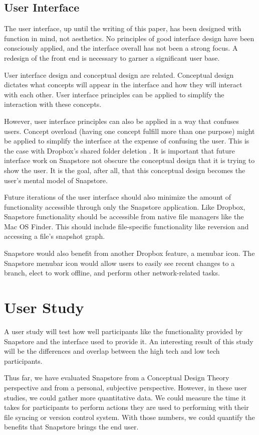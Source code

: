 \subsection{User Interface}

The user interface, up until the writing of this paper, has been designed with function in mind, not aesthetics. No principles of good interface design have been consciously applied, and the interface overall has not been a strong focus. A redesign of the front end is necessary to garner a significant user base.

User interface design and conceptual design are related. Conceptual design dictates what concepts will appear in the interface and how they will interact with each other. User interface principles can be applied to simplify the interaction with these concepts. 

However, user interface principles can also be applied in a way that confuses users. Concept overload (having one concept fulfill more than one purpose) might be applied to simplify the interface at the expense of confusing the user. This is the case with Dropbox's shared folder deletion \cite{Zhang}. It is important that future interface work on Snapstore not obscure the conceptual design that it is trying to show the user. It is the goal, after all, that this conceptual design becomes the user's mental model of Snapstore.

Future iterations of the user interface should also minimize the amount of functionality accessible through only the Snapstore application. Like Dropbox, Snapstore functionality should be accessible from native file managers like the Mac OS Finder. This should include file-specific functionality like reversion and accessing a file's snapshot graph.

Snapstore would also benefit from another Dropbox feature, a menubar icon. The Snapstore menubar icon would allow users to easily see recent changes to a branch, elect to work offline, and perform other network-related tasks.

\section{User Study}

A user study will test how well participants like the functionality provided by Snapstore and the interface used to provide it. An interesting result of this study will be the differences and overlap between the high tech and low tech participants.

Thus far, we have evaluated Snapstore from a Conceptual Design Theory perspective and from a personal, subjective perspective. However, in these user studies, we could gather more quantitative data. We could measure the time it takes for participants to perform actions they are used to performing with their file syncing or version control system. With those numbers, we could quantify the benefits that Snapstore brings the end user.





